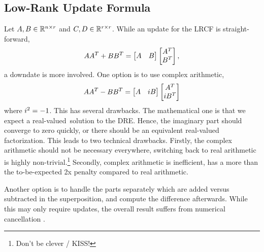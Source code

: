 
\subsection{Low-Rank Update Formula}
\label{sec:lr:update}

Let $A, B \in\mathbb{R}^{n\times r}$ and $C, D\in\mathbb{R}^{r\times r}$.
While an update for the \ac{LRCF} is straight-forward,
\begin{equation}
  AA^T + BB^T =
  \begin{bmatrix}
    A & B
  \end{bmatrix}
  \begin{bmatrix}
    A^T \\ B^T
  \end{bmatrix}
  ,
\end{equation}
a downdate is more involved.
One option is to use complex arithmetic, \ie
\begin{equation}
  AA^T - BB^T =
  \begin{bmatrix}
    A & i B
  \end{bmatrix}
  \begin{bmatrix}
    A^T \\ i B^T
  \end{bmatrix}
\end{equation}
where $i^2=-1$.
This has several drawbacks.
The mathematical one is that we expect a real-valued\ solution to the \ac{DRE}.
Hence, the imaginary part should converge to zero quickly,
or there should be an equivalent real-valued factorization.
This leads to two technical drawbacks.
Firstly, the complex arithmetic should not be necessary everywhere,
switching back to real arithmetic is highly non-trivial.\footnote{Don't be clever / KISS!}
Secondly, complex arithmetic is inefficient, \ie has a more than the to-be-expected 2x penalty compared to real arithmetic.

Another option is to handle the parts separately which are added versus subtracted in the superposition,
and compute the difference afterwards.
While this may only require updates,
the overall result suffers from numerical cancellation
\cite[50]{Lang2015}
\cite[\pno~186, thesis~10]{Lang2017}.


